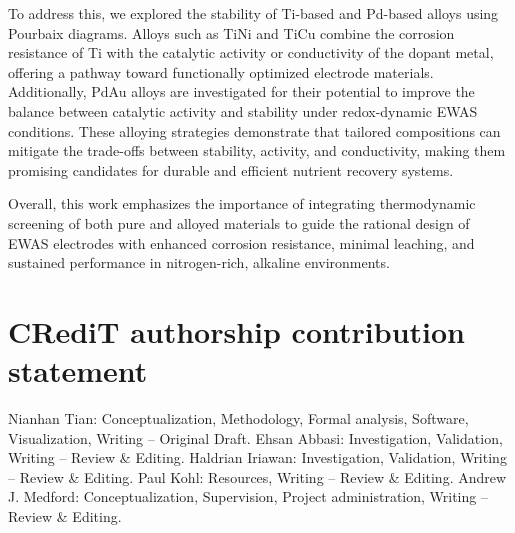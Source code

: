 \documentclass[journal=jacsat,manuscript=article]{achemso}
\begin{document}
To address this, we explored the stability of Ti-based and Pd-based alloys using Pourbaix diagrams. Alloys such as TiNi and TiCu combine the corrosion resistance of Ti with the catalytic activity or conductivity of the dopant metal, offering a pathway toward functionally optimized electrode materials. Additionally, PdAu alloys are investigated for their potential to improve the balance between catalytic activity and stability under redox-dynamic EWAS conditions. These alloying strategies demonstrate that tailored compositions can mitigate the trade-offs between stability, activity, and conductivity, making them promising candidates for durable and efficient nutrient recovery systems.

Overall, this work emphasizes the importance of integrating thermodynamic screening of both pure and alloyed materials to guide the rational design of EWAS electrodes with enhanced corrosion resistance, minimal leaching, and sustained performance in nitrogen-rich, alkaline environments.




\section{CRediT authorship contribution statement}
Nianhan Tian: Conceptualization, Methodology, Formal analysis, Software, Visualization, Writing – Original Draft.  
Ehsan Abbasi: Investigation, Validation, Writing – Review \& Editing.  
Haldrian Iriawan: Investigation, Validation, Writing – Review \& Editing.  
Paul Kohl: Resources, Writing – Review \& Editing.  
Andrew J. Medford: Conceptualization, Supervision, Project administration, Writing – Review \& Editing.





\begin{acknowledgement}



\end{acknowledgement}
\end{document}
